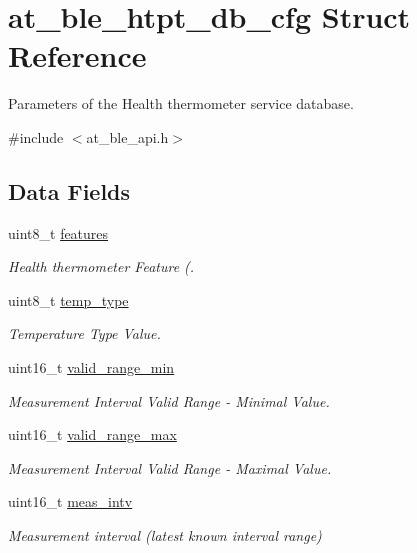 \hypertarget{structat__ble__htpt__db__cfg}{}\section{at\+\_\+ble\+\_\+htpt\+\_\+db\+\_\+cfg Struct Reference}
\label{structat__ble__htpt__db__cfg}


Parameters of the Health thermometer service database.  




{\ttfamily \#include $<$at\+\_\+ble\+\_\+api.\+h$>$}

\subsection*{Data Fields}
\begin{DoxyCompactItemize}
\item 
uint8\+\_\+t \mbox{\hyperlink{structat__ble__htpt__db__cfg_aa6b1dd1bb9c0c2e9967e4a7f61644db1}{features}}
\begin{DoxyCompactList}\small\item\em Health thermometer Feature (. \end{DoxyCompactList}\item 
uint8\+\_\+t \mbox{\hyperlink{structat__ble__htpt__db__cfg_ae670e214854c4f3876a6895c9dae37ac}{temp\+\_\+type}}
\begin{DoxyCompactList}\small\item\em Temperature Type Value. \end{DoxyCompactList}\item 
uint16\+\_\+t \mbox{\hyperlink{structat__ble__htpt__db__cfg_a2224870093f4e135fcbf23688840e9a3}{valid\+\_\+range\+\_\+min}}
\begin{DoxyCompactList}\small\item\em Measurement Interval Valid Range -\/ Minimal Value. \end{DoxyCompactList}\item 
uint16\+\_\+t \mbox{\hyperlink{structat__ble__htpt__db__cfg_a3684ac35d7423febfda2abfc9333d36a}{valid\+\_\+range\+\_\+max}}
\begin{DoxyCompactList}\small\item\em Measurement Interval Valid Range -\/ Maximal Value. \end{DoxyCompactList}\item 
uint16\+\_\+t \mbox{\hyperlink{structat__ble__htpt__db__cfg_aeb599955ad46d909818ed82e07c45181}{meas\+\_\+intv}}
\begin{DoxyCompactList}\small\item\em Measurement interval (latest known interval range) \end{DoxyCompactList}\end{DoxyCompactItemize}


